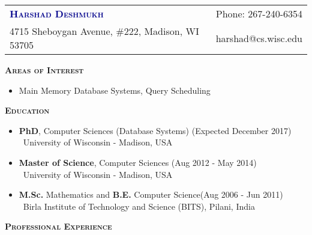 \documentclass[11pt]{article}
\begin{document}
\begin{flushleft}
\begin{tabular*}{\textwidth}{@{\extracolsep{\fill}}lr}%
{\LARGE{\textcolor{darkblue}{\textbf{\textsc{Harshad Deshmukh}}}}} & Phone: 267-240-6354\\
4715 Sheboygan Avenue, \#222, Madison, WI 53705 & harshad@cs.wisc.edu
\end{tabular*}
\end{flushleft}
\begin{mdframed}[backgroundcolor=light-gray, linecolor=light-gray, roundcorner=10pt, shadow=false, shadowsize=1pt]
\Large{\textbf{\textsc{Areas of Interest}}}
\end{mdframed}
\begin{itemize}
	\item[]Main Memory Database Systems, Query Scheduling
\end{itemize}
\begin{mdframed}[backgroundcolor=light-gray, linecolor=light-gray, roundcorner=10pt, shadow=false, shadowsize=1pt]
\Large{\textbf{\textsc{Education}}}
\end{mdframed}
\begin{itemize}\addtolength{\itemsep}{-0.5\baselineskip}%
\item{\textbf{PhD}, Computer Sciences (Database Systems) \hfill (Expected December 2017) }\\
	\textendash\ University of Wisconsin - Madison, USA
\item{\textbf{Master of Science}, Computer Sciences \hfill (Aug 2012 - May 2014) }\\
	\textendash\ University of Wisconsin - Madison, USA
\item{\textbf{M.Sc.} Mathematics and \textbf{B.E.} Computer Science\hfill (Aug 2006 - Jun 2011) }\\
	\textendash\ Birla Institute of Technology and Science (BITS), Pilani, India
\end{itemize}
\begin{mdframed}[backgroundcolor=light-gray, linecolor=light-gray, roundcorner=10pt, shadow=false, shadowsize=1pt]
\Large{\textbf{\textsc{Professional Experience}}}
\end{mdframed}
\end{document}
